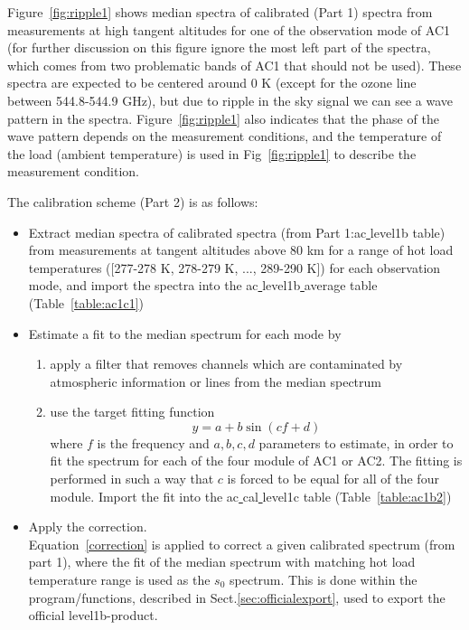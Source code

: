Figure~\ref{fig:ripple1} shows median spectra of calibrated (Part 1) spectra
from measurements at high tangent altitudes for one of the
observation mode of AC1 (for further discussion on this figure
ignore the most left part of the spectra, which comes from two 
problematic bands of AC1 that should not be used). 
These spectra are expected to be 
centered around 0 K (except for the ozone line between 544.8-544.9 GHz), 
but due to ripple in the sky signal we can see a wave pattern in the spectra.
Figure~\ref{fig:ripple1} also indicates that the phase of the wave pattern
depends on the measurement conditions, and the temperature of
the load (ambient temperature) is used in Fig~\ref{fig:ripple1}
to describe the measurement condition.


The calibration scheme (Part 2) is as follows:
\begin{itemize}
\item Extract median spectra of calibrated spectra 
(from Part 1:ac\underline{ }level1b table) 
from measurements at tangent altitudes above 80 km for a range of hot load 
temperatures ([277-278 K, 278-279 K, ..., 289-290 K]) 
for each observation mode, and import the spectra
into the ac\underline{ }level1b\underline{ }average table
(Table~\ref{table:ac1c1})
\item Estimate a fit to the median spectrum for each mode by
\begin{enumerate}
\item apply a filter that removes channels which are contaminated by 
atmospheric information or lines from the median spectrum 
\item use the target fitting function  
\begin{equation}
y=a+ b\sin(cf+d)
\end{equation}
where \(f\) is the frequency and \(a,b,c,d\) parameters to estimate,
in order to fit the spectrum for each of the four module of AC1 or AC2.
The fitting is performed in such a way that \(c\) is forced 
to be equal for all of the four module. 
Import the fit into the ac\underline{ }cal\underline{ }level1c
table (Table~\ref{table:ac1b2})
\end{enumerate}
\item Apply the correction.\\
Equation~\ref{correction} is applied to correct a given calibrated 
spectrum (from part 1), where the fit of the median spectrum
with matching hot load temperature range is used as the \(s_{0}\)
spectrum. 
This is done within the program/functions, described in
Sect.\ref{sec:officialexport}, used to export the official
level1b-product.  
\end{itemize}



